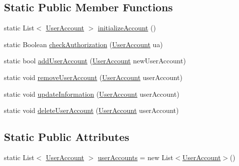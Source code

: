 \subsection*{Static Public Member Functions}
\begin{DoxyCompactItemize}
\item 
static List$<$ \hyperlink{class_health___assignment_1_1_user_account}{User\+Account} $>$ \hyperlink{class_health___assignment_1_1_user_accounts_data_abe747ab6877290ae36368a2f25a62082}{initialize\+Account} ()
\item 
static Boolean \hyperlink{class_health___assignment_1_1_user_accounts_data_a47cf71402fe54f67e8828dcd857fd2bb}{check\+Authorization} (\hyperlink{class_health___assignment_1_1_user_account}{User\+Account} ua)
\item 
static bool \hyperlink{class_health___assignment_1_1_user_accounts_data_a94422d16624b9098724228181dd76072}{add\+User\+Account} (\hyperlink{class_health___assignment_1_1_user_account}{User\+Account} new\+User\+Account)
\item 
static void \hyperlink{class_health___assignment_1_1_user_accounts_data_af7ad97e73ee657908a93035f5be613d8}{remove\+User\+Account} (\hyperlink{class_health___assignment_1_1_user_account}{User\+Account} user\+Account)
\item 
static void \hyperlink{class_health___assignment_1_1_user_accounts_data_ac365693b8cfbaad0cd0d81b006a1d5b1}{update\+Information} (\hyperlink{class_health___assignment_1_1_user_account}{User\+Account} user\+Account)
\item 
static void \hyperlink{class_health___assignment_1_1_user_accounts_data_a67b62fb02b830459012e41412d31b641}{delete\+User\+Account} (\hyperlink{class_health___assignment_1_1_user_account}{User\+Account} user\+Account)
\end{DoxyCompactItemize}
\subsection*{Static Public Attributes}
\begin{DoxyCompactItemize}
\item 
static List$<$ \hyperlink{class_health___assignment_1_1_user_account}{User\+Account} $>$ \hyperlink{class_health___assignment_1_1_user_accounts_data_ae5f48ce87aa61e7f4cbb967fcbe22eef}{user\+Accounts} = new List$<$\hyperlink{class_health___assignment_1_1_user_account}{User\+Account}$>$()
\end{DoxyCompactItemize}


